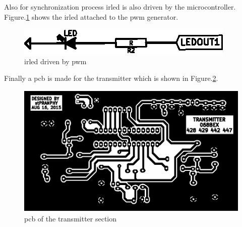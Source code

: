Also for synchronization process \gls{irled} is also driven by the microcontroller. Figure.\ref{fig:IRLEDCircuit} shows the \gls{irled} attached to the \gls{pwm} generator.

\begin{figure}
	\centering
	\includegraphics{Images/IRLEDCircuit.eps}
	\caption{\gls{irled} driven by \gls{pwm}}
	\label{fig:IRLEDCircuit}
\end{figure}

Finally a \gls{pcb} is made for the transmitter which is shown in Figure.\ref{fig:TransmitterPCB}.

\begin{figure}
	\centering
	\includegraphics{Images/TransmitterPCB.eps}
	\caption{\gls{pcb} of the transmitter section}
	\label{fig:TransmitterPCB}
\end{figure}


